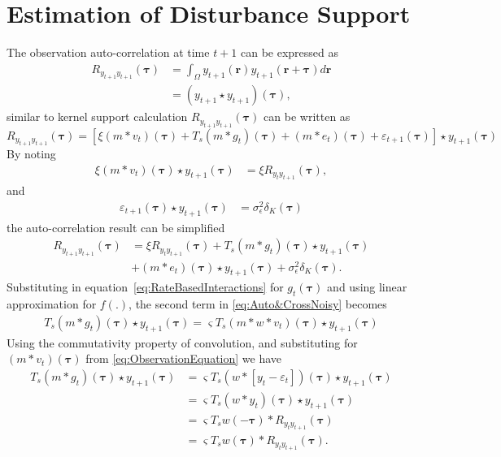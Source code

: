 \documentclass[]{article}
\begin{document}
\newpage
\section*{Estimation of Disturbance Support}
The observation auto-correlation at time $t+1$ can be expressed as
\begin{align}
	R_{y_{t+1}y_{t+1}}(\boldsymbol{\tau})& =\int_{\Omega} y_{t+1}(\mathbf{r}) y_{t+1}(\mathbf{r}+\boldsymbol{\tau}) d\mathbf{r}
 \nonumber \\
 &=(y_{t+1} \star y_{t+1})(\boldsymbol\tau),
\end{align}
similar to  kernel support calculation $R_{y_{t+1}y_{t+1}}(\boldsymbol{\tau})$ can be written as 
\begin{equation}
	R_{y_{t+1}y_{t+1}}(\boldsymbol{\tau}) = \left[  \xi(m\ast v_{t})(\boldsymbol\tau)+T_s(m\ast g_{t})(\boldsymbol\tau)+(m\ast e_{t})(\boldsymbol{\tau})+\varepsilon_{t+1}(\boldsymbol\tau)\right] \star  y_{t+1}(\boldsymbol{\tau}) 
\end{equation}
By noting 
\begin{align}\label{eq:term1}
  \xi(m\ast v_{t})(\boldsymbol\tau)\star  y_{t+1}(\boldsymbol{\tau})&=\xi R_{y_ty_{t+1}}(\boldsymbol{\tau}),
\end{align}
and
\begin{align}\label{eq:term2}
 \varepsilon_{t+1}(\boldsymbol\tau)\star y_{t+1}(\boldsymbol\tau)&=\sigma_{\epsilon}^2\delta_K(\boldsymbol{\tau})
\end{align}
the auto-correlation result can be simplified
\begin{align}\label{eq:Auto&CrossNoisy}
	R_{y_{t+1}y_{t+1}}(\boldsymbol{\tau}) &= \xi R_{y_ty_{t+1}}(\boldsymbol{\tau})+ T_s (m\ast g_t)(\boldsymbol\tau) \star y_{t+1}(\boldsymbol\tau) \nonumber \\
	&+(m\ast e_t)(\boldsymbol\tau)\star y_{t+1}(\boldsymbol\tau)+\sigma_{\epsilon}^2\delta_K(\boldsymbol{\tau}).
\end{align}
Substituting in equation~\ref{eq:RateBasedInteractions} for $g_t(\boldsymbol\tau)$ and using linear approximation for $f(.)$, the second term in \eqref{eq:Auto&CrossNoisy} becomes
\begin{align}
	 T_s (m\ast g_t)(\boldsymbol\tau) \star y_{t+1}(\boldsymbol\tau) = \varsigma T_s(m\ast w*v_t)(\boldsymbol\tau) \star y_{t+1}(\boldsymbol\tau)
\end{align}
Using the commutativity property of convolution, and substituting for $(m\ast v_t)(\boldsymbol\tau)$ from \ref{eq:ObservationEquation} we have
\begin{align}\label{eq:term3}
	T_s (m\ast g_t)(\boldsymbol\tau) \star y_{t+1}(\boldsymbol\tau)&=  \varsigma T_s \left( w\ast \left[y_t-\varepsilon_t \right]\right)(\boldsymbol\tau) \star y_{t+1}(\boldsymbol\tau) \nonumber \\
&=\varsigma T_s(w\ast y_t)(\boldsymbol{\tau}) \star  y_{t+1}(\boldsymbol{\tau}) \nonumber \\
&=\varsigma T_s w(-\boldsymbol\tau)\ast R_{y_ty_{t+1}} (\boldsymbol{\tau}) \nonumber \\
&=\varsigma T_s w(\boldsymbol\tau)\ast R_{y_ty_{t+1}} (\boldsymbol{\tau}).
\end{align}
\end{document}
